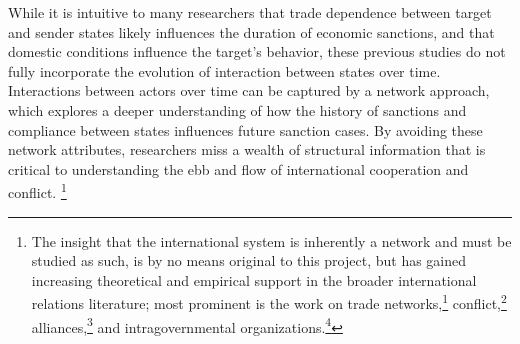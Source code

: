 While it is intuitive to many researchers that trade dependence between target and sender states likely influences the duration of economic sanctions, and that domestic conditions influence the target's behavior, these previous studies do not fully incorporate the evolution of interaction between states over time. Interactions between actors over time can be captured by a network approach, which explores a deeper understanding of how the history of sanctions and compliance between states influences future sanction cases. By avoiding these network attributes, researchers miss a wealth of structural information that is critical to understanding the ebb and flow of international cooperation and conflict. \footnote{The insight that the international system is inherently a network and must be studied as such, is by no means original to this project, but has gained increasing theoretical and empirical support in the broader international relations literature; most prominent is the work on trade networks,\footnote{\cite{hoff2004modeling, ward:rainbow:2013}} conflict,\footnote{\cite{AnneAuthor}} alliances,\footnote{\cite{warren2010geometry}} and intragovernmental organizations.\footnote{\cite{cao2009networks,greenhill2010norm}}}



